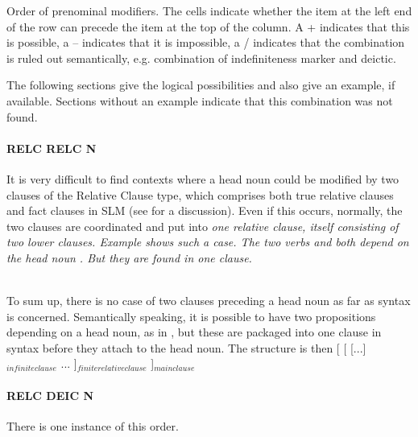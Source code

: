 \begin{table}
	\caption[Order of prenominal modifiers]{Order of prenominal modifiers. The cells indicate whether the item at the left end of the row can precede the item at the top of the column. A + indicates that this is possible, a -- indicates that it is impossible, a / indicates that the combination is ruled out semantically, e.g. combination of indefiniteness marker and deictic.}
	\label{tab:OrderOfPrenominalModifiers}
\end{table}

The following sections give the logical possibilities and also give an example, if available. Sections without an example indicate that this combination was not found.

\paragraph{RELC RELC N}
It is very difficult to find contexts where a head noun could be modified by two clauses of the Relative Clause type, which comprises both true relative clauses and fact clauses in SLM (see  for a discussion). Even if this occurs, normally, the two clauses are coordinated and put into \em one \em relative clause, itself consisting of two lower clauses. Example  shows such a case. The two verbs  and  both depend on the head noun . But they are found in \em one \em clause.

\\

To sum up, there is no case of two clauses preceding a head noun as far as syntax is concerned. Semantically speaking, it is possible to have two propositions depending on a head noun, as in , but these are packaged into one clause in syntax before they attach to the head noun. The structure is then
[
		[
			[...]$_{infinite clause}$ ...
		]$_{finite relative clause}$
]$_{main clause}$


\paragraph{RELC DEIC N}
There is one instance of this order.

